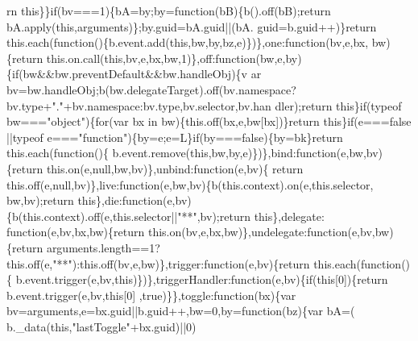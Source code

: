 \begin{DoxyCode}
      rn this\}\}if(bv===1)\{bA=by;by=function(bB)\{b().off(bB);return bA.apply(this,arguments)\};by.guid=bA.guid||(bA.
      guid=b.guid++)\}return this.each(function()\{b.event.add(this,bw,by,bz,e)\})\},one:\textcolor{keyword}{function}(bv,e,bx,
      bw)\{return this.on.call(this,bv,e,bx,bw,1)\},off:\textcolor{keyword}{function}(bw,e,by)\{if(bw&&bw.preventDefault&&bw.handleObj)\{v
      ar bv=bw.handleObj;b(bw.delegateTarget).off(bv.namespace?bv.type+\textcolor{stringliteral}{"."}+bv.namespace:bv.type,bv.selector,bv.han
      dler);return this\}\textcolor{keywordflow}{if}(typeof bw===\textcolor{stringliteral}{"object"})\{for(var bx in bw)\{this.off(bx,e,bw[bx])\}\textcolor{keywordflow}{return} \textcolor{keyword}{this}\}\textcolor{keywordflow}{if}(e===\textcolor{keyword}{false}
      ||typeof e===\textcolor{stringliteral}{"function"})\{by=e;e=L\}\textcolor{keywordflow}{if}(by===\textcolor{keyword}{false})\{by=bk\}\textcolor{keywordflow}{return} this.each(\textcolor{keyword}{function}()\{
      b.event.remove(\textcolor{keyword}{this},bw,by,e)\})\},bind:\textcolor{keyword}{function}(e,bw,bv)\{\textcolor{keywordflow}{return} this.on(e,null,bw,bv)\},unbind:\textcolor{keyword}{function}(e,bv)\{\textcolor{keywordflow}{
      return} this.off(e,null,bv)\},live:\textcolor{keyword}{function}(e,bw,bv)\{b(this.context).on(e,this.selector,
      bw,bv);\textcolor{keywordflow}{return} \textcolor{keyword}{this}\},die:\textcolor{keyword}{function}(e,bv)\{b(this.context).off(e,this.selector||\textcolor{stringliteral}{"**"},bv);\textcolor{keywordflow}{return} \textcolor{keyword}{this}\},delegate:\textcolor{keyword}{
      function}(e,bv,bx,bw)\{\textcolor{keywordflow}{return} this.on(bv,e,bx,bw)\},undelegate:\textcolor{keyword}{function}(e,bv,bw)\{\textcolor{keywordflow}{return} arguments.length==1?
      this.off(e,\textcolor{stringliteral}{"**"}):this.off(bv,e,bw)\},trigger:\textcolor{keyword}{function}(e,bv)\{\textcolor{keywordflow}{return} this.each(\textcolor{keyword}{function}()\{
      b.event.trigger(e,bv,\textcolor{keyword}{this})\})\},triggerHandler:\textcolor{keyword}{function}(e,bv)\{\textcolor{keywordflow}{if}(\textcolor{keyword}{this}[0])\{\textcolor{keywordflow}{return} b.event.trigger(e,bv,\textcolor{keyword}{this}[0]
      ,\textcolor{keyword}{true})\}\},toggle:\textcolor{keyword}{function}(bx)\{var bv=arguments,e=bx.guid||b.guid++,bw=0,by=\textcolor{keyword}{function}(bz)\{var bA=(
      b.\_data(\textcolor{keyword}{this},\textcolor{stringliteral}{"lastToggle"}+bx.guid)||0)%

\end{DoxyCode}
